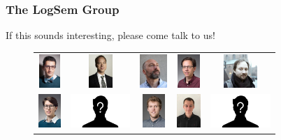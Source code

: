 \documentclass[usenames,dvipsnames,aspectratio=169,12pt]{beamer}
\begin{document}
\begin{frame}
  \frametitle{The LogSem Group}
  If this sounds interesting, please come talk to us!
  \begin{figure}
    \begin{tabular}{ccccc}
    {\includegraphics[height = 0.5in]{aslan.jpg}}      &
    {\includegraphics[height = 0.5in]{lars.jpg}}       &
    {\includegraphics[height = 0.5in]{bas.jpg}}        &
    {\includegraphics[height = 0.5in]{jaco.jpg}}       &
    {\includegraphics[height = 0.5in]{danil.jpg}}     \\
    {\includegraphics[height = 0.5in]{sabine.jpg}}     &
    {\includegraphics[height = 0.5in]{alix.png}}       &
    {\includegraphics[height = 0.5in]{kristoffer.jpg}} &
    {\includegraphics[height = 0.5in]{johan.jpg}}      &
    {\includegraphics[height = 0.5in]{martin.png}}    \\

\end{tabular}
\end{figure}
\end{frame}
\end{document}
